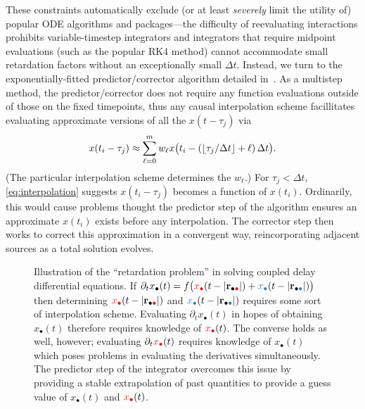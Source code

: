 These constraints automatically exclude (or at least \emph{severely} limit the utility of) popular ODE algorithms and packages---the difficulty of reevaluating interactions prohibits variable-timestep integrators and integrators that require midpoint evaluations (such as the popular RK4 method) cannot accommodate small retardation factors without an exceptionally small $\Delta t$.
Instead, we turn to the exponentially-fitted predictor/corrector algorithm detailed in~\cite{Glaser2009}.
As a multistep method, the predictor/corrector does not require any function evaluations outside of those on the fixed timepoints, thus any causal interpolation scheme facillitates evaluating approximate versions of all the $x(t - \tau_j)$ via
\begin{equation}
  x(t_i - \tau_j) \approx \sum_{\ell = 0}^m w_\ell x\qty\big(t_i - (\lfloor\tau_j/\Delta t\rfloor + \ell)\, \Delta t).
  \label{eq:interpolation}
\end{equation}
(The particular interpolation scheme determines the $w_\ell$.)
For $\tau_j < \Delta t$, \cref{eq:interpolation} suggests $x(t_i - \tau_j)$ becomes a function of $x(t_i)$.
Ordinarily, this would cause problems thought the predictor step of the algorithm ensures an approximate $x(t_i)$ exists before any interpolation.
The corrector step then works to correct this approximation in a convergent way, reincorporating adjacent sources as a total solution evolves.
  
\begin{figure}[]
  \centering
  \caption{\label{fig:retardation problem} Illustration of the ``retardation problem'' in solving coupled delay differential equations.
    If $\partial_t x_\bullet(t) = f\qty\big(\textcolor[RGB]{228,26,28}{x_\bullet}(t - \abs{\vb{r}_{\bullet \textcolor[RGB]{228,26,28}{\bullet}}}) + \textcolor[RGB]{55,126,184}{x_\bullet}(t - \abs{\vb{r}_{\bullet \textcolor[RGB]{55,126,184}{\bullet}}}))$ then determining $\textcolor[RGB]{228,26,28}{x_\bullet}(t - \abs{\vb{r}_{\bullet \textcolor[RGB]{228,26,28}{\bullet}}})$ and $\textcolor[RGB]{55,126,184}{x_\bullet}(t - \abs{\vb{r}_{\bullet \textcolor[RGB]{55,126,184}{\bullet}}})$ requires some sort of interpolation scheme.
    Evaluating $\partial_t x_\bullet(t)$ in hopes of obtaining $x_\bullet(t)$ therefore requires knowledge of $\textcolor[RGB]{228,26,28}{x_\bullet}(t)$.
    The converse holds as well, however; evaluating $\partial_t \textcolor[RGB]{228,26,28}{x_\bullet}(t)$ requires knowledge of $x_\bullet(t)$ which poses problems in evaluating the derivatives simultaneously.
    The predictor step of the integrator overcomes this issue by providing a stable extrapolation of past quantities to provide a guess value of $x_\bullet(t)$ and $\textcolor[RGB]{228,26,28}{x_\bullet}(t)$.
  }
\end{figure}


